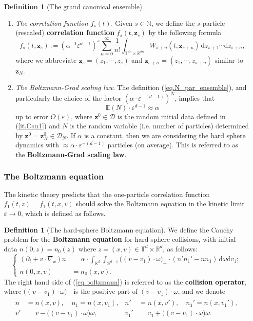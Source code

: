 \documentclass[10pt, reqno]{amsart}
\newcommand{\Eb}{\mathbb E}
\newcommand{\Nb}{\mathbb N}
\newcommand{\Rb}{\mathbb R}
\newcommand{\Sb}{\mathbb S}
\newcommand{\Tb}{\mathbb T}
\newcommand{\Dc}{\mathcal D}
\newcommand{\vz}{\boldsymbol{z}}
\theoremstyle{definition}
\newtheorem{definition}[theorem]{Definition}
\theoremstyle{remark}
\numberwithin{equation}{section}
\begin{document}
\begin{definition}[The grand canonical ensemble]
\begin{enumerate}
\item\label{it.Can3} \emph{The correlation function $f_s(t)$}. Given $s\in\Nb$, we define the $s$-particle (rescaled) \textbf{correlation function} $f_s(t,\vz_s)$ by the following formula
\begin{equation}\label{eq.s_par_cor}
f_s(t,\vz_s):=(\alpha^{-1}\varepsilon^{d-1})^s\sum_{n=0}^\infty\frac{1}{n!}\int_{\Tb^{dn}\times\Rb^{dn}}W_{s+n}(t,\vz_{s+n})\,\mathrm{d}z_{s+1}\cdots \mathrm{d}z_{s+n},
\end{equation} where we abbreviate $\vz_s=(z_1,\cdots,z_s)$ and $\vz_{s+n}=(z_1,\cdots,z_{s+n})$ similar to $\vz_N$.
\item\label{it.Can4} \emph{The Boltzmann-Grad scaling law}. The definition (\ref{eq.N_par_ensemble}), and particularly the choice of the factor $(\alpha\cdot\varepsilon^{-(d-1)})^N$, implies that
\begin{equation}\label{eq.Bol-Grad}\Eb(N)\cdot \varepsilon^{d-1}\approx \alpha
\end{equation} up to error $O(\varepsilon)$, where $\vz^0\in\Dc$ is the random initial data defined in (\ref{it.Can1}) and $N$ is the random variable (i.e. number of particles) determined by $\vz^0=\vz_N^0\in\Dc_N$. If $\alpha$ is a constant, then we are considering the hard sphere dynamics with $\approx \alpha\cdot\varepsilon^{-(d-1)}$ particles (on average). This is referred to as the \textbf{Boltzmann-Grad scaling law}.
\end{enumerate}
\end{definition}
\subsubsection{The Boltzmann equation} The kinetic theory predicts that the one-particle correlation function $f_1(t,z)=f_1(t,x,v)$ should solve the Boltzmann equation in the kinetic limit $\varepsilon\to 0$, which is defined as follows.
\begin{definition}[The hard-sphere Boltzmann equation]\label{def.boltzmann} We define the Cauchy problem for the \textbf{Boltzmann equation} for hard sphere collisions, with initial data $n(0,z)=n_0(z)$ where $z=(x,v)\in\Tb^d\times\Rb^{d}$, as follows:
\begin{equation}\label{eq.boltzmann}
\left\{
\begin{aligned}
(\partial_t+v\cdot\nabla_x)n&=\alpha\cdot\int_{\Rb^d}\int_{\Sb^{d-1}}\big((v-v_1)\cdot\omega\big)_+\cdot(n'n_1'-nn_1)\,\mathrm{d}\omega\mathrm{d}v_1;\\
n(0,x,v)&=n_0(x,v).
\end{aligned}
\right.
\end{equation}
The right hand side of (\ref{eq.boltzmann}) is referred to as the \textbf{collision operator}, where $\big((v-v_1)\cdot\omega\big)_+$ is the positive part of $(v-v_1)\cdot\omega$, and we denote
\[
\begin{aligned}
n&=n(x,v),\quad n_1=n(x,v_1),&n'&=n(x,v'),\quad n_1'=n(x,v_1'),\\
 v'&=v-\big((v-v_1)\cdot\omega\big)\omega,&v_1'&=v_1+\big((v-v_1)\cdot\omega\big)\omega.
 \end{aligned}
 \]
\end{definition}
\end{document}
